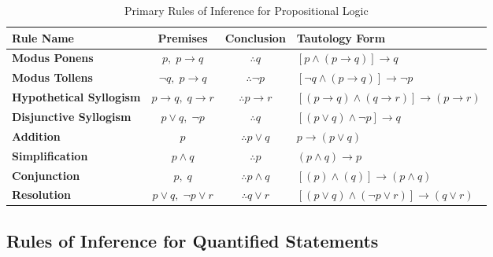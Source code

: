 \documentclass[11pt,a4paper]{article}
\begin{document}
\begin{table}[htbp]
\centering
\small
\begin{tabularx}{\textwidth}{|l|c|c|X|}
\hline
\rowcolor{primaryblue} \color{white}\textbf{Rule Name} & \color{white}\textbf{Premises} & \color{white}\textbf{Conclusion} & \color{white}\textbf{Tautology Form} \\ \hline
\textbf{Modus Ponens} & $p, \; p \rightarrow q$ & $\therefore q$ & $[p \land (p \rightarrow q)] \rightarrow q$ \\ \hline
\textbf{Modus Tollens} & $\neg q, \; p \rightarrow q$ & $\therefore \neg p$ & $[\neg q \land (p \rightarrow q)] \rightarrow \neg p$ \\ \hline
\textbf{Hypothetical Syllogism} & $p \rightarrow q, \; q \rightarrow r$ & $\therefore p \rightarrow r$ & $[(p \rightarrow q) \land (q \rightarrow r)] \rightarrow (p \rightarrow r)$ \\ \hline
\textbf{Disjunctive Syllogism} & $p \lor q, \; \neg p$ & $\therefore q$ & $[(p \lor q) \land \neg p] \rightarrow q$ \\ \hline
\textbf{Addition} & $p$ & $\therefore p \lor q$ & $p \rightarrow (p \lor q)$ \\ \hline
\textbf{Simplification} & $p \land q$ & $\therefore p$ & $(p \land q) \rightarrow p$ \\ \hline
\textbf{Conjunction} & $p, \; q$ & $\therefore p \land q$ & $[(p) \land (q)] \rightarrow (p \land q)$ \\ \hline
\textbf{Resolution} & $p \lor q, \; \neg p \lor r$ & $\therefore q \lor r$ & $[(p \lor q) \land (\neg p \lor r)] \rightarrow (q \lor r)$ \\ \hline
\end{tabularx}
\caption{Primary Rules of Inference for Propositional Logic}
\end{table}

\subsection{Rules of Inference for Quantified Statements}
\end{document}
